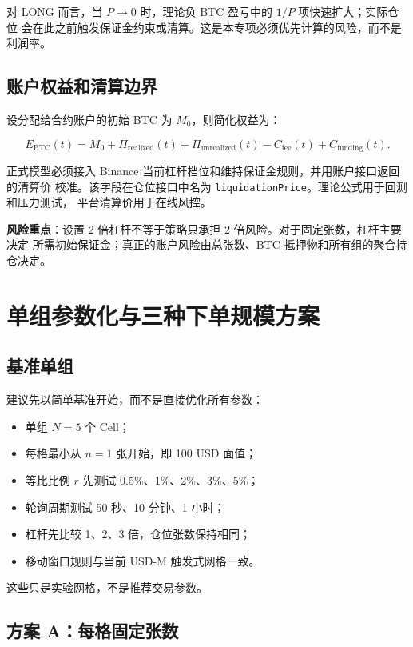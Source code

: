 \documentclass[11pt,a4paper,fontset=none]{ctexart}
\newcommand{\RiskPoint}{\textcolor{CoinRed}{\textbf{风险重点}}}
\begin{document}
对 LONG 而言，当 $P\rightarrow0$ 时，理论负 BTC 盈亏中的 $1/P$ 项快速扩大；实际仓位
会在此之前触发保证金约束或清算。这是本专项必须优先计算的风险，而不是利润率。

\subsection{账户权益和清算边界}

设分配给合约账户的初始 BTC 为 $M_0$，则简化权益为：

\begin{equation}
  E_{\mathrm{BTC}}(t)=M_0+\Pi_{\mathrm{realized}}(t)
  +\Pi_{\mathrm{unrealized}}(t)-C_{\mathrm{fee}}(t)
  +C_{\mathrm{funding}}(t).
\end{equation}

正式模型必须接入 Binance 当前杠杆档位和维持保证金规则，并用账户接口返回的清算价
校准。该字段在仓位接口中名为 \texttt{liquidationPrice}。理论公式用于回测和压力测试，
平台清算价用于在线风控。

\RiskPoint：设置 2 倍杠杆不等于策略只承担 2 倍风险。对于固定张数，杠杆主要决定
所需初始保证金；真正的账户风险由总张数、BTC 抵押物和所有组的聚合持仓决定。

\section{单组参数化与三种下单规模方案}

\subsection{基准单组}

建议先以简单基准开始，而不是直接优化所有参数：

\begin{itemize}
  \item 单组 $N=5$ 个 Cell；
  \item 每格最小从 $n=1$ 张开始，即 100 USD 面值；
  \item 等比比例 $r$ 先测试 0.5\%、1\%、2\%、3\%、5\%；
  \item 轮询周期测试 50 秒、10 分钟、1 小时；
  \item 杠杆先比较 1、2、3 倍，仓位张数保持相同；
  \item 移动窗口规则与当前 USD-M 触发式网格一致。
\end{itemize}

这些只是实验网格，不是推荐交易参数。

\subsection{方案 A：每格固定张数}
\end{document}

